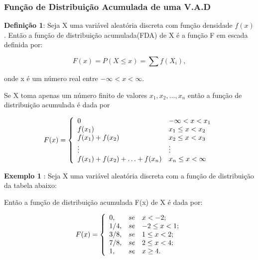 \newpage
\subsubsection{Função de Distribuição Acumulada de uma V.A.D}

\textbf{Definição 1}: Seja X uma variável aleatória discreta com
função densidade $f(x)$. Então a função de distribuição
acumulada(FDA) de X é a função F em escada definida por:

\begin{equation}\label{}
    F(x)=P(X \leq x)= \sum f(X_{i}),
\end{equation}

onde x é um número real entre $-\infty < x < \infty$.\vskip0.3cm


Se X toma apenas um número finito de valores
$x_{1},x_{2},...,x_{n}$ então a função de distribuição acumulada é
dada por

$$
F(x)=
\left\{%
\begin{array}{ll}
    0                                     & \hbox{$-\infty< x < x_{1}$} \\
    f(x_{1})                              & \hbox{$x_{1} \leq x < x_{2}$} \\
    f(x_{1})+f(x_{2})                     & \hbox{$x_{2} \leq x < x_{3}$} \\
    \vdots                                & \hbox{$\vdots$} \\
    f(x_{1})+f(x_{2})+\ldots+  f(x_{n})   & \hbox{$x_{n} \leq x < \infty$} \\
\end{array}%
\right.
$$


\textbf{Exemplo 1} : Seja X uma variável aleatória discreta com a
função de distribuição da tabela abaixo:


\begin{table}[!htb]
\end{table}


Então a função de distribuição acumulada F(x) de X é dada por:

$$
F(x)=
\left\{%
\begin{array}{ll}
   0   , & se \quad \hbox{$x < -2$;} \\
   1/4 , & se \quad \hbox{$-2 \leq x < 1$;} \\
   3/8 , & se \quad \hbox{$1 \leq x < 2$;} \\
   7/8 , & se \quad \hbox{$2 \leq x < 4$;} \\
   1   , & se \quad \hbox{$x \geq 4$.} \\
\end{array}%
\right.
$$

